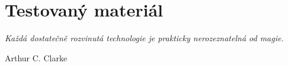 \chapter{Testovaný materiál}
\label{chap:material}

\epigraph{\hfill\textit{Každá dostatečně rozvinutá technologie je prakticky nerozeznatelná od magie.}}{Arthur C. Clarke}



